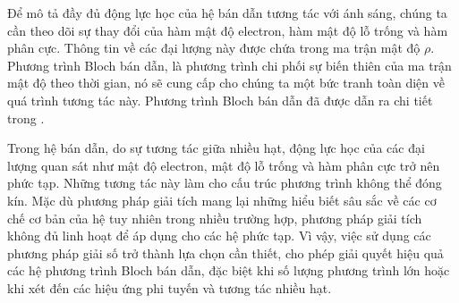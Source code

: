 \documentclass[%
reprint,
amsmath,amssymb,
superscriptaddress,
aps,
]{revtex4-2}
\begin{document}
Để mô tả đầy đủ động lực học của hệ bán dẫn tương tác với ánh sáng, chúng ta cần theo dõi sự thay đổi của hàm mật độ electron, hàm mật độ lỗ trống và hàm phân cực. Thông tin về các đại lượng này được chứa trong ma trận mật độ $\rho$. Phương trình Bloch bán dẫn, là phương trình chi phối sự biến thiên của ma trận mật độ theo thời gian, nó sẽ cung cấp cho chúng ta một bức tranh toàn diện về quá trình tương tác này. Phương trình Bloch bán dẫn đã được dẫn ra chi tiết trong {\cite{doi:10.1142/7184}}.

Trong hệ bán dẫn, do sự tương tác giữa nhiều hạt, động lực học của các đại lượng quan sát như mật độ electron, mật độ lỗ trống và hàm phân cực trở nên phức tạp. Những tương tác này làm cho cấu trúc phương trình không thể đóng kín. Mặc dù phương pháp giải tích mang lại những hiểu biết sâu sắc về các cơ chế cơ bản của hệ tuy nhiên trong nhiều trường hợp, phương pháp giải tích không đủ linh hoạt để áp dụng cho các hệ phức tạp. Vì vậy, việc sử dụng các phương pháp giải số trở thành lựa chọn cần thiết, cho phép giải quyết hiệu quả các hệ phương trình Bloch bán dẫn, đặc biệt khi số lượng phương trình lớn hoặc khi xét đến các hiệu ứng phi tuyến và tương tác nhiều hạt.
\end{document}
